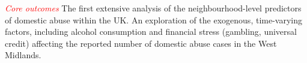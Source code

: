 \documentclass[11pt, a4paper]{article}
\begin{document}
\textcolor{red}{\textit{Core outcomes}} The first extensive analysis of the neighbourhood-level predictors of domestic abuse within the UK. An exploration of the exogenous, time-varying factors, including alcohol consumption and financial stress (gambling, universal credit) affecting the reported number of domestic abuse cases in the West Midlands. 



%
%
%
%
%
%
%
%
%


%
%

%
%
%
%
%
%
%
%

\newpage



\end{document}
